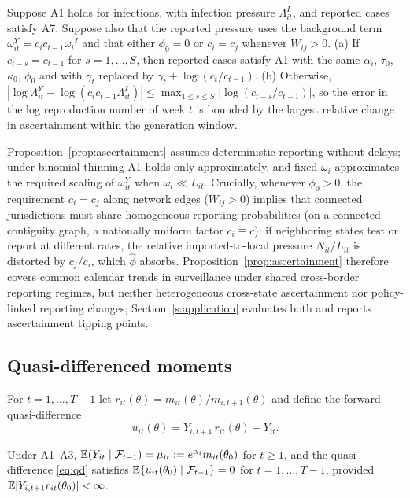 \begin{proposition}[Ascertainment]
\label{prop:ascertainment}
Suppose A1 holds for infections, with infection pressure $\Lambda^{I}_{it}$, and reported cases
satisfy A7. Suppose also that the reported pressure uses the background term
$\omega^{Y}_{it}=c_ic_{t-1}\omega_i{}^{I}$ and that either $\phi_0=0$ or $c_i=c_j$ whenever $W_{ij}>0$.
(a) If $c_{t-s}=c_{t-1}$ for $s=1,\dots,S$, then reported cases satisfy A1 with the same
$\alpha_i$, $\tau_0$, $\kappa_0$, $\phi_0$ and with $\gamma_t$ replaced by $\gamma_t+\log(c_t/c_{t-1})$.
(b) Otherwise, $|\log\Lambda^{Y}_{it}-\log(c_ic_{t-1}\Lambda^{I}_{it})|\le\max_{1\le s\le S}|\log(c_{t-s}/c_{t-1})|$,
so the error in the log reproduction number of week $t$ is bounded by the largest relative change
in ascertainment within the generation window.
\end{proposition}

Proposition~\ref{prop:ascertainment} assumes deterministic reporting without delays; under binomial
thinning A1 holds only approximately, and fixed $\omega_i$ approximates the required scaling of
$\omega^Y_{it}$ when $\omega_i\ll L_{it}$. Crucially, whenever $\phi_0>0$, the requirement $c_i=c_j$ along network edges ($W_{ij}>0$) implies that connected jurisdictions must share homogeneous reporting probabilities (on a connected contiguity graph, a nationally uniform factor $c_i\equiv c$): if neighboring states test or report at different rates, the relative imported-to-local pressure $N_{it}/L_{it}$ is distorted by $c_j/c_i$, which $\hat\phi$ absorbs. Proposition~\ref{prop:ascertainment} therefore covers common calendar trends in surveillance under shared cross-border reporting regimes, but neither heterogeneous cross-state ascertainment nor policy-linked reporting changes; Section~\ref{s:application} evaluates both and reports ascertainment tipping points.

\subsection{Quasi-differenced moments}
\label{ss:moments}

For $t=1,\dots,T-1$ let $r_{it}(\theta)=m_{it}(\theta)/m_{i,t+1}(\theta)$ and define the forward
quasi-difference \citep{chamberlain1992sequential,wooldridge1997multiplicative}
\begin{equation}
u_{it}(\theta)=Y_{i,t+1}\,r_{it}(\theta)-Y_{it}.
\label{eq:qd}
\end{equation}

\begin{lemma}
\label{lem:moment}
Under A1--A3, $\mathbb{E}(Y_{it}\mid\mathcal{F}_{t-1})=\mu_{it}:=e^{\alpha_i}m_{it}(\theta_0)$ for $t\ge 1$, and
the quasi-difference \eqref{eq:qd} satisfies $\mathbb{E}\{u_{it}(\theta_0)\mid\mathcal{F}_{t-1}\}=0$ for $t=1,\dots,T-1$, provided
$\mathbb{E}|Y_{i,t+1}r_{it}(\theta_0)|<\infty$.
\end{lemma}

